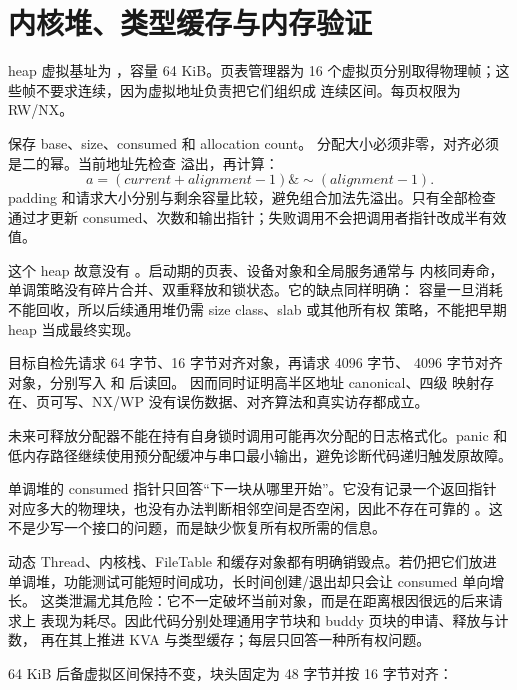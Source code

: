 \section{内核堆、类型缓存与内存验证}

heap 虚拟基址为 ，容量 64 KiB。页表管理器为
16 个虚拟页分别取得物理帧；这些帧不要求连续，因为虚拟地址负责把它们组织成
连续区间。每页权限为 RW/NX。

 保存 base、size、consumed 和 allocation count。
分配大小必须非零，对齐必须是二的幂。当前地址先检查
 溢出，再计算：
\[
  a=(current+alignment-1)\mathbin{\&}\sim(alignment-1).
\]
padding 和请求大小分别与剩余容量比较，避免组合加法先溢出。只有全部检查
通过才更新 consumed、次数和输出指针；失败调用不会把调用者指针改成半有效值。

这个 heap 故意没有 。启动期的页表、设备对象和全局服务通常与
内核同寿命，单调策略没有碎片合并、双重释放和锁状态。它的缺点同样明确：
容量一旦消耗不能回收，所以后续通用堆仍需 size class、slab 或其他所有权
策略，不能把早期 heap 当成最终实现。

目标自检先请求 64 字节、16 字节对齐对象，再请求 4096 字节、
4096 字节对齐
对象，分别写入
 和  后读回。
 因而同时证明高半区地址 canonical、四级
映射存在、页可写、NX/WP 没有误伤数据、对齐算法和真实访存都成立。

未来可释放分配器不能在持有自身锁时调用可能再次分配的日志格式化。panic 和
低内存路径继续使用预分配缓冲与串口最小输出，避免诊断代码递归触发原故障。

单调堆的 consumed 指针只回答“下一块从哪里开始”。它没有记录一个返回指针
对应多大的物理块，也没有办法判断相邻空间是否空闲，因此不存在可靠的
。这不是少写一个接口的问题，而是缺少恢复所有权所需的信息。

动态 Thread、内核栈、FileTable 和缓存对象都有明确销毁点。若仍把它们放进
单调堆，功能测试可能短时间成功，长时间创建/退出却只会让 consumed 单向增长。
这类泄漏尤其危险：它不一定破坏当前对象，而是在距离根因很远的后来请求上
表现为耗尽。因此代码分别处理通用字节块和 buddy 页块的申请、释放与计数，
再在其上推进 KVA 与类型缓存；每层只回答一种所有权问题。

64 KiB 后备虚拟区间保持不变，块头固定为 48 字节并按 16 字节对齐：

